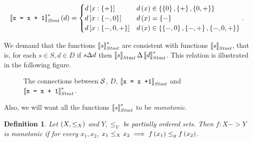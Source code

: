 \documentclass[..thesis.tex]{subfiles}
\newtheorem{defin}{Definition}[section]
\begin{document}
\begin{equation*}
\left\llbracket \text{\texttt{x = x + 1}} \right\rrbracket_{\mathit{Stmt}}^{*} \left( d \right) =
\begin{cases}
d \left[ x : \left\lbrace + \right\rbrace \right] & d \left( x \right)  \in \left\lbrace  \left\lbrace 0  \right\rbrace, \left\lbrace + \right\rbrace, \left\lbrace 0, + \right\rbrace \right\rbrace  \\
d \left[ x : \left\lbrace -, 0 \right\rbrace \right] & d \left( x \right) =  \left\lbrace - \right\rbrace \\
d \left[ x : \left\lbrace -, 0, + \right\rbrace \right] & d \left( x \right) \in \left\lbrace \left\lbrace -,0 \right\rbrace, \left\lbrace -, + \right\rbrace, \left\lbrace -, 0, + \right\rbrace \right\rbrace \\
\end{cases}
\text{.}      
\end{equation*}

We demand that the functions $\left\llbracket s \right\rrbracket_{Stmt}^{*}$ are consistent with functions $\left\llbracket s \right\rrbracket_{Stmt}$, that is,
for each $s \in S, d \in D$ if $s \Delta d$ then $ \left\llbracket s \right\rrbracket_{Stmt} \Delta \left\llbracket d \right\rrbracket_{Stmt}^{*}$.
This relation is illustrated in the following figure.

\begin{figure}[H]
  \label{fig:transfer-consistent}
  \begin{centering}
  \end{centering}
  \caption{The connections between $\mathcal{S}$, $D$, $\left\llbracket \text{\texttt{x = x +1}}  \right\rrbracket_{Stmt}$ and $\left\llbracket \text{\texttt{x = x + 1}} \right\rrbracket_{Stmt}^{*}$.}
\end{figure}

Also, we will want all the functions $\left\llbracket s \right\rrbracket_{Stmt}^{*}$ to be \textit{monotonic}.

\begin{defin}
Let $\left( X, \leq_X \right)$ and $Y, \leq_Y$ be partially ordered sets.
Then $f : X -> Y$ is \textit{monotonic} if for every $x_1, x_2$, $x_1 \leq_X x_2 \implies f \left( x_1 \right) \leq_y f \left( x_2 \right)$.   
\end{defin}
\end{document}

